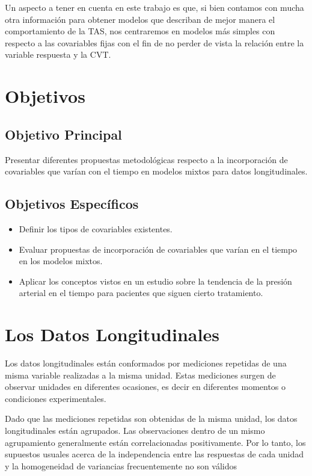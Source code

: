 \documentclass[spanish]{article}
\numberwithin{figure}{subsection}
\numberwithin{equation}{subsection}
\numberwithin{table}{subsection}
\begin{document}
Un aspecto a tener en cuenta en este trabajo es que, si bien contamos con mucha
otra información para obtener modelos que describan de mejor manera el
comportamiento de la TAS, nos centraremos en modelos más simples con respecto a
las covariables fijas con el fin de no perder de vista la relación entre la
variable respuesta y la CVT.

\newpage
\section{Objetivos}

\subsection{Objetivo Principal}

Presentar diferentes propuestas metodológicas respecto a la incorporación de
covariables que varían con el tiempo en modelos mixtos para datos
longitudinales.

\subsection{Objetivos Específicos}

\begin{itemize}
	\item Definir los tipos de covariables existentes.
	\item Evaluar propuestas de incorporación de covariables que varían en el
	tiempo en los modelos mixtos.
	\item Aplicar los conceptos vistos en un estudio sobre la tendencia de la
		  presión arterial en el tiempo para pacientes que siguen cierto
		  tratamiento.
\end{itemize}

\newpage
\section{Los Datos Longitudinales}

Los datos longitudinales están conformados por mediciones repetidas de una
misma variable realizadas a la misma unidad. Estas mediciones surgen de
observar unidades en diferentes ocasiones, es decir en diferentes momentos o
condiciones experimentales.

Dado que las mediciones repetidas son obtenidas de la misma unidad, los datos
longitudinales están agrupados. Las observaciones dentro de un mismo
agrupamiento generalmente están correlacionadas positivamente. Por lo tanto,
los supuestos usuales acerca de la independencia entre las respuestas de cada
unidad y la homogeneidad de variancias frecuentemente no son válidos
\end{document}
